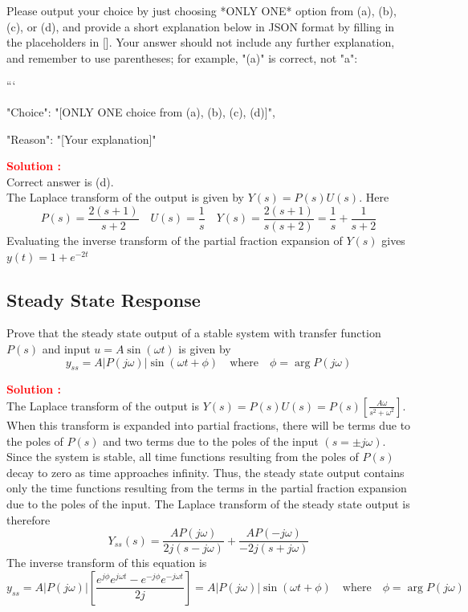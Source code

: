 \documentclass[12pt]{article}
\begin{document}
Please output your choice by just choosing *ONLY ONE* option from (a), (b), (c), or (d), and provide a short explanation below in JSON format by filling in the placeholders in []. Your answer should not include any further explanation, and remember to use parentheses; for example, "(a)" is correct, not "a": 

```
{

"Choice": "[ONLY ONE choice from (a), (b), (c), (d)]",

"Reason": "[Your explanation]"

}

\textbf{\textcolor{red}{Solution :}} \\
Correct answer is (d).\\
The Laplace transform of the output is given by \(Y(s) = P(s) U(s)\). Here 
\begin{equation}
    P(s) = \frac{2(s+1)}{s+2} \quad U(s)  =\frac{1}{s} \quad Y(s) = \frac{2(s+1)}{s(s+2)} = \frac{1}{s} + \frac{1}{s+2}
\end{equation}
Evaluating the inverse transform of the partial fraction expansion of \(Y(s)\) gives \(y(t) = 1 + e^{-2t}\)
\clearpage

\subsection{Steady State Response}

Prove that the steady state output of a stable system with transfer function \(P(s)\) and input \(u = A \sin(\omega t)\) is given by
\[ y_{ss} = A|P(j\omega)| \sin(\omega t + \phi) \quad \text{where} \quad  \phi = \arg P(j\omega) \]

\textbf{\textcolor{red}{Solution :}} \\
The Laplace transform of the output is \(Y(s) = P(s)U(s) = P(s) \left[ \frac{A\omega}{s^2 + \omega^2} \right]\).
When this transform is expanded into partial fractions, there will be terms due to the poles of \(P(s)\) and two terms due to the poles of the input \((s = \pm j\omega)\). Since the system is stable, all time functions resulting from the poles of \(P(s)\) decay to zero as time approaches infinity. Thus, the steady state output contains only the time functions resulting from the terms in the partial fraction expansion due to the poles of the input. The Laplace transform of the steady state output is therefore
\[ Y_{ss}(s) = \frac{AP(j\omega)}{2j(s-j\omega)} + \frac{AP(-j\omega)}{-2j(s+j\omega)} \]
The inverse transform of this equation is
\[ y_{ss} = A|P(j\omega)| \left[\frac{e^{j\phi} e^{j\omega t} - e^{-j\phi} e^{-j\omega t}}{2j} \right] =  A|P(j\omega)| \sin(\omega t + \phi) \quad \text{where} \quad  \phi = \arg P(j\omega) \]
\clearpage
\end{document}

